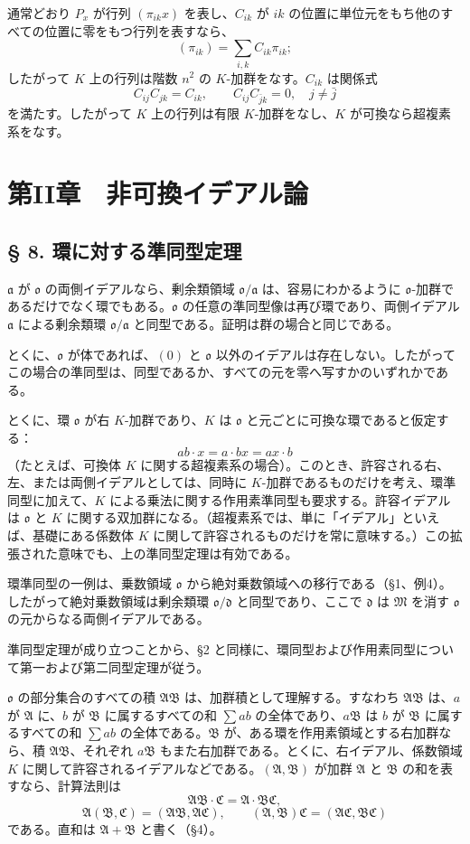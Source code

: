 \documentclass[11pt]{article}
\providecommand{\mA}{\mathfrak{A}}
\providecommand{\mB}{\mathfrak{B}}
\providecommand{\mC}{\mathfrak{C}}
\providecommand{\mM}{\mathfrak{M}}
\providecommand{\mo}{\mathfrak{o}}
\providecommand{\ma}{\mathfrak{a}}
\providecommand{\md}{\mathfrak{d}}
\begin{document}
通常どおり $P_x$ が行列 $(\pi_{ik}x)$ を表し、$C_{ik}$ が $ik$ の位置に単位元をもち他のすべての位置に零をもつ行列を表すなら、
\[
        (\pi_{ik})=\sum_{i,k} C_{ik}\pi_{ik};
\]
したがって $K$ 上の行列は階数 $n^2$ の $K$-加群をなす。$C_{ik}$ は関係式
\[
        C_{ij}C_{jk}=C_{ik},
        \qquad
        C_{ij}C_{\bar j k}=0,\quad j\ne\bar j
\]
を満たす。したがって $K$ 上の行列は有限 $K$-加群をなし、$K$ が可換なら超複素系をなす。

\section*{第II章　非可換イデアル論}

\subsection*{§ 8. 環に対する準同型定理}

$\ma$ が $\mo$ の両側イデアルなら、剰余類領域 $\mo/\ma$ は、容易にわかるように $\mo$-加群であるだけでなく環でもある。$\mo$ の任意の準同型像は再び環であり、両側イデアル $\ma$ による剰余類環 $\mo/\ma$ と同型である。証明は群の場合と同じである。

とくに、$\mo$ が体であれば、$(0)$ と $\mo$ 以外のイデアルは存在しない。したがってこの場合の準同型は、同型であるか、すべての元を零へ写すかのいずれかである。

とくに、環 $\mo$ が右 $K$-加群であり、$K$ は $\mo$ と元ごとに可換な環であると仮定する：
\[
        ab\cdot x=a\cdot bx=ax\cdot b
\]
（たとえば、可換体 $K$ に関する超複素系の場合）。このとき、許容される右、左、または両側イデアルとしては、同時に $K$-加群であるものだけを考え、環準同型に加えて、$K$ による乗法に関する作用素準同型も要求する。許容イデアルは $\mo$ と $K$ に関する双加群になる。（超複素系では、単に「イデアル」といえば、基礎にある係数体 $K$ に関して許容されるものだけを常に意味する。）この拡張された意味でも、上の準同型定理は有効である。

環準同型の一例は、乗数領域 $\mo$ から絶対乗数領域への移行である（§1、例4）。したがって絶対乗数領域は剰余類環 $\mo/\md$ と同型であり、ここで $\md$ は $\mM$ を消す $\mo$ の元からなる両側イデアルである。

準同型定理が成り立つことから、§2 と同様に、環同型および作用素同型について第一および第二同型定理が従う。

$\mo$ の部分集合のすべての積 $\mA\mB$ は、加群積として理解する。すなわち $\mA\mB$ は、$a$ が $\mA$ に、$b$ が $\mB$ に属するすべての和 $\sum ab$ の全体であり、$a\mB$ は $b$ が $\mB$ に属するすべての和 $\sum ab$ の全体である。$\mB$ が、ある環を作用素領域とする右加群なら、積 $\mA\mB$、それぞれ $a\mB$ もまた右加群である。とくに、右イデアル、係数領域 $K$ に関して許容されるイデアルなどである。$(\mA,\mB)$ が加群 $\mA$ と $\mB$ の和を表すなら、計算法則は
\[
        \mA\mB\cdot\mC=\mA\cdot\mB\mC,
\]
\[
        \mA(\mB,\mC)=(\mA\mB,\mA\mC),
        \qquad
        (\mA,\mB)\mC=(\mA\mC,\mB\mC)
\]
である。直和は $\mA+\mB$ と書く（§4）。
\end{document}
